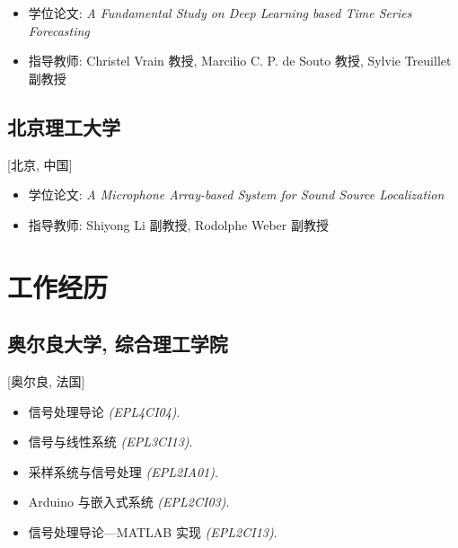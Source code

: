 \documentclass{mycv}
\begin{document}
\begin{itemize}
  \itemsep 0em
  \item 学位论文: \textit{A Fundamental Study on Deep Learning based Time Series Forecasting}
  \item 指导教师: Christel Vrain 教授, Marcilio C. P. de Souto 教授, Sylvie Treuillet 副教授
\end{itemize}

\vspace{-\parskip}

\subsection{\large 北京理工大学}[北京, 中国]

\begin{positions}
\end{positions}

\begin{itemize}
  \itemsep 0em
  \item 学位论文: \textit{A Microphone Array-based System for Sound Source Localization}
  \item 指导教师: Shiyong Li 副教授, Rodolphe Weber 副教授
\end{itemize}

\vspace{-1em}

\section{工作经历}

\subsection{\large 奥尔良大学, 综合理工学院}[奥尔良, 法国]

\begin{positions}
\end{positions}

\begin{itemize}
  \itemsep 0em
  \item 信号处理导论 \textit{(EPL4CI04)}.
  \item 信号与线性系统 \textit{(EPL3CI13)}.
  \item 采样系统与信号处理 \textit{(EPL2IA01)}.
  \item Arduino 与嵌入式系统 \textit{(EPL2CI03)}.
  \item 信号处理导论---MATLAB 实现 \textit{(EPL2CI13)}.
\end{itemize}
\end{document}
